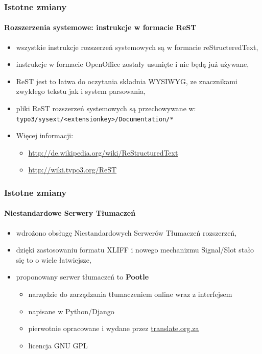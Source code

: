 \begin{frame}[fragile]
	\frametitle{Istotne zmiany}
	\framesubtitle{Rozszerzenia systemowe: instrukcje w formacie ReST}

	\begin{itemize}
		\item wszystkie instrukcje rozszerzeń systemowych są w formacie reStructeredText,
		\item instrukcje w formacie OpenOffice zostały usunięte i nie będą już używane,
		\item ReST jest to łatwa do oczytania składnia WYSIWYG, ze znacznikami zwykłego tekstu jak i system parsowania,
		\item pliki ReST rozszerzeń systemowych są przechowywane w:\newline
			\texttt{typo3/sysext/<extensionkey>/Documentation/*}

		\item Więcej informacji:

			\begin{itemize}
				\item \url{http://de.wikipedia.org/wiki/ReStructuredText}
				\item \url{http://wiki.typo3.org/ReST}
			\end{itemize}

	\end{itemize}

\end{frame}


\begin{frame}[fragile]
	\frametitle{Istotne zmiany}
	\framesubtitle{Niestandardowe Serwery Tłumaczeń}

	\begin{itemize}
		\item wdrożono obsługę Niestandardowych Serwerów Tłumaczeń rozszerzeń,
		\item dzięki zastosowaniu formatu XLIFF i nowego mechanizmu Signal/Slot stało się to o wiele łatwiejsze,
		\item proponowany serwer tłumaczeń to \textbf{Pootle}

			\begin{itemize}
				\item narzędzie do zarządzania tłumaczeniem online wraz z interfejsem 
				\item napisane w Python/Django
				\item pierwotnie opracowane i wydane przez \url{translate.org.za}
				\item licencja GNU GPL
			\end{itemize}

	\end{itemize}

\end{frame}

